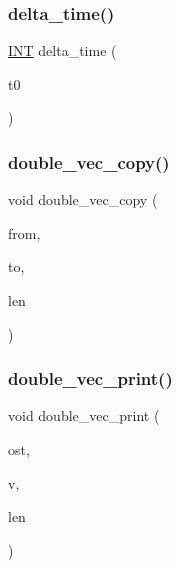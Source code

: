 \mbox{\label{util_8_c_aba5a9b4461d821d782f03b5665db1934}} 
\subsubsection{\texorpdfstring{delta\+\_\+time()}{delta\_time()}}
{\footnotesize\ttfamily \mbox{\hyperlink{galois_8h_a09fddde158a3a20bd2dcadb609de11dc}{I\+NT}} delta\+\_\+time (\begin{DoxyParamCaption}\item[{\mbox{\hyperlink{galois_8h_a09fddde158a3a20bd2dcadb609de11dc}{I\+NT}}}]{t0 }\end{DoxyParamCaption})}

\mbox{\label{util_8_c_aee0c436dfcfcb2f8a9b32f01ec90033a}} 
\subsubsection{\texorpdfstring{double\+\_\+vec\+\_\+copy()}{double\_vec\_copy()}}
{\footnotesize\ttfamily void double\+\_\+vec\+\_\+copy (\begin{DoxyParamCaption}\item[{double $\ast$}]{from,  }\item[{double $\ast$}]{to,  }\item[{\mbox{\hyperlink{galois_8h_a09fddde158a3a20bd2dcadb609de11dc}{I\+NT}}}]{len }\end{DoxyParamCaption})}

\mbox{\label{util_8_c_a769d593927060ae1885b4a72aa296048}} 
\subsubsection{\texorpdfstring{double\+\_\+vec\+\_\+print()}{double\_vec\_print()}}
{\footnotesize\ttfamily void double\+\_\+vec\+\_\+print (\begin{DoxyParamCaption}\item[{ostream \&}]{ost,  }\item[{double $\ast$}]{v,  }\item[{\mbox{\hyperlink{galois_8h_a09fddde158a3a20bd2dcadb609de11dc}{I\+NT}}}]{len }\end{DoxyParamCaption})}


